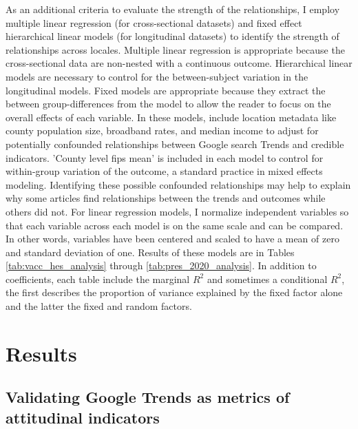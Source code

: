 As an additional criteria to evaluate the strength of the relationships, I
employ multiple linear regression (for cross-sectional datasets) and fixed
effect hierarchical linear models \citep{pinheiro_etal21} (for longitudinal
datasets) to identify the strength of relationships across locales. Multiple
linear regression is appropriate because the cross-sectional data are non-nested
with a continuous outcome. Hierarchical linear models are necessary to control
for the between-subject variation in the longitudinal models. Fixed models are
appropriate because they extract the between group-differences from the model to
allow the reader to focus on the overall effects of each variable. In these
models, include location metadata like county population size, broadband rates,
and median income to adjust for potentially confounded relationships between
Google search Trends and credible indicators. 'County level fips mean' is included
in each model to control for within-group variation of the outcome, a standard practice
in mixed effects modeling. Identifying these possible
confounded relationships may help to explain why some articles find
relationships between the trends and outcomes while others did not. For linear
regression models, I normalize independent variables so that each variable
across each model is on the same scale and can be compared. In other words,
variables have been centered and scaled to have a mean of zero and standard
deviation of one. Results of these models are in Tables
\ref{tab:vacc_hes_analysis} through \ref{tab:pres_2020_analysis}. 
In addition to coefficients, each table include the marginal $R^2$ and sometimes 
a conditional $R^2$, the first describes the proportion of variance explained by the fixed factor alone and the latter the fixed and random factors. 

\section{Results}

\subsection{Validating Google Trends as metrics of attitudinal indicators}




